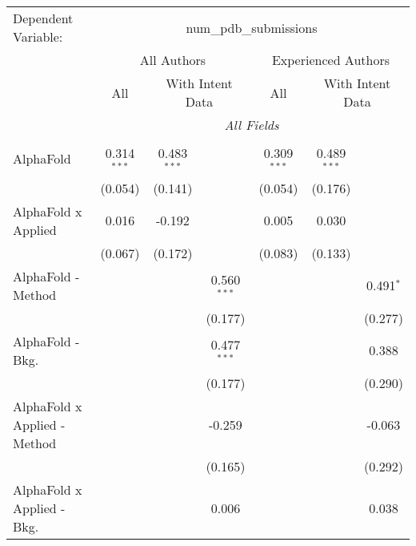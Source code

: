 \begingroup
\centering
\begin{tabular}{lcccccc}
   \tabularnewline \midrule \midrule
   Dependent Variable: & \multicolumn{6}{c}{num\_pdb\_submissions}\\
 & \multicolumn{3}{c}{All Authors} & \multicolumn{3}{c}{Experienced Authors} \\
\cmidrule(lr){2-4} \cmidrule(lr){5-7}
 & \multicolumn{1}{c}{All} & \multicolumn{2}{c}{With Intent Data} & \multicolumn{1}{c}{All} & \multicolumn{2}{c}{With Intent Data} \\
\cmidrule(lr){2-2} \cmidrule(lr){3-4} \cmidrule(lr){5-5} \cmidrule(lr){6-7}
 & \multicolumn{6}{c}{\textit{All Fields}} \\ \\
   AlphaFold                      & 0.314$^{***}$  & 0.483$^{***}$ &               & 0.309$^{***}$  & 0.489$^{***}$ &   \\   
                                  & (0.054)        & (0.141)       &               & (0.054)        & (0.176)       &   \\   
   AlphaFold x Applied            & 0.016          & -0.192        &               & 0.005          & 0.030         &   \\   
                                  & (0.067)        & (0.172)       &               & (0.083)        & (0.133)       &   \\   
   AlphaFold - Method             &                &               & 0.560$^{***}$ &                &               & 0.491$^{*}$\\   
                                  &                &               & (0.177)       &                &               & (0.277)\\   
   AlphaFold - Bkg.               &                &               & 0.477$^{***}$ &                &               & 0.388\\   
                                  &                &               & (0.177)       &                &               & (0.290)\\   
   AlphaFold x Applied - Method   &                &               & -0.259        &                &               & -0.063\\   
                                  &                &               & (0.165)       &                &               & (0.292)\\   
   AlphaFold x Applied - Bkg.     &                &               & 0.006         &                &               & 0.038\\   

\end{tabular}
